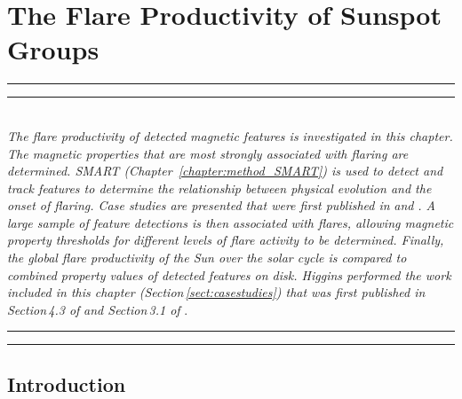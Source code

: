 
\chapter{The Flare Productivity of Sunspot Groups} %
\label{chapter:results_activity}


\graphicspath{{X/figures/EPS/}{5/figures/}}

\glsresetall

\hrule height 1mm
\vspace{0.5mm}
\hrule height 0.4mm 
\noindent 
\\ \emph{The flare productivity of detected magnetic features is investigated in this chapter. The magnetic properties that are most strongly associated with flaring are determined. SMART (Chapter~\ref{chapter:method_SMART}) is used to detect and track features to determine the relationship between physical evolution and the onset of flaring. Case studies are presented that were first published in}  \emph{and} \emph{. A large sample of feature detections is then associated with flares, allowing magnetic property thresholds for different levels of flare activity to be determined. Finally, the global flare productivity of the Sun over the solar cycle is compared to combined property values of detected features on disk. Higgins performed the work included in this chapter (Section\,\ref{sect:casestudies}) that was first published in  Section\,4.3 of}  \emph{and Section\,3.1 of} . \\ 
\hrule height 0.4mm
\vspace{0.5mm}
\hrule height 1mm 
\vspace{1.5cm}


\section{Introduction}

